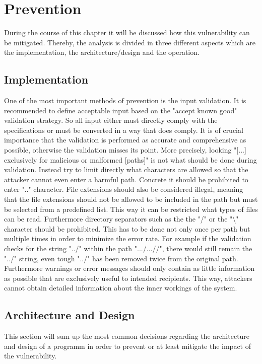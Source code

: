 \section{Prevention}
\label{mitigation}
During the course of this chapter it will be discussed how this vulnerability can be mitigated. Thereby, the analysis is divided in three different aspects which are the implementation, the architecture/design and the operation.

\subsection{Implementation}
\label{implementation}
One of the most important methods of prevention is the input validation. It is recommended to define acceptable input based on the "accept known good" validation strategy. So all input either must directly comply with the specifications or must be converted in a way that does comply. It is of crucial importance that the validation is performed as accurate and comprehensive as possible, otherwise the validation misses its point. More precisely, looking "[...] exclusively for malicious or malformed [paths]" \autocite{CWE22-Definition:online} is not what should be done during validation. Instead try to limit directly what characters are allowed so that the attacker cannot even enter a harmful path. Concrete it should be prohibited to enter ".." character. File extensions should also be considered illegal, meaning that the file extensions should not be allowed to be included in the path but must be selected from a predefined list. This way it can be restricted what types of files can be read. Furthermore directory separators such as the the "/" or the "\textbackslash" character should be prohibited. This has to be done not only once per path but multiple times in order to minimize the error rate. For example if the validation checks for the string "../" within the path ".../...//", there would still remain the "../" string, even tough "../" has been removed twice from the original path. \autocite{CWE22-Definition:online}\\
Furthermore warnings or error messages should only contain as little information as possible that are exclusively useful to intended recipients. This way, attackers cannot obtain detailed information about the inner workings of the system. \autocite{CWE22-Definition:online}

\subsection{Architecture and Design}
\label{design}
This section will sum up the most common decisions regarding the architecture and design of a programm in order to prevent or at least mitigate the impact of the vulnerability.

